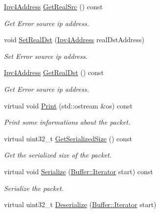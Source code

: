 \begin{DoxyCompactItemize}
\hyperlink{classns3_1_1Ipv4Address}{Ipv4\+Address} \hyperlink{classns3_1_1dsr_1_1DsrOptionAckHeader_aea48708d400fd6c6424c5b35a170c189}{Get\+Real\+Src} () const 
\begin{DoxyCompactList}\small\item\em Get Error source ip address. \end{DoxyCompactList}\item 
void \hyperlink{classns3_1_1dsr_1_1DsrOptionAckHeader_a539090972c2e824a62b09321589bbd3c}{Set\+Real\+Dst} (\hyperlink{classns3_1_1Ipv4Address}{Ipv4\+Address} real\+Dst\+Address)
\begin{DoxyCompactList}\small\item\em Set Error source ip address. \end{DoxyCompactList}\item 
\hyperlink{classns3_1_1Ipv4Address}{Ipv4\+Address} \hyperlink{classns3_1_1dsr_1_1DsrOptionAckHeader_ac5b157fac3da1a9f86b34dd310b55ee8}{Get\+Real\+Dst} () const 
\begin{DoxyCompactList}\small\item\em Get Error source ip address. \end{DoxyCompactList}\item 
virtual void \hyperlink{classns3_1_1dsr_1_1DsrOptionAckHeader_a9d0f87fa77b2b48cd71df5af52ed7f8a}{Print} (std\+::ostream \&os) const 
\begin{DoxyCompactList}\small\item\em Print some informations about the packet. \end{DoxyCompactList}\item 
virtual uint32\+\_\+t \hyperlink{classns3_1_1dsr_1_1DsrOptionAckHeader_ae76c79094943851d7f297b1fcd51003e}{Get\+Serialized\+Size} () const 
\begin{DoxyCompactList}\small\item\em Get the serialized size of the packet. \end{DoxyCompactList}\item 
virtual void \hyperlink{classns3_1_1dsr_1_1DsrOptionAckHeader_a0aeceebc3c3eb4f5241b4799b5eed36b}{Serialize} (\hyperlink{classns3_1_1Buffer_1_1Iterator}{Buffer\+::\+Iterator} start) const 
\begin{DoxyCompactList}\small\item\em Serialize the packet. \end{DoxyCompactList}\item 
virtual uint32\+\_\+t \hyperlink{classns3_1_1dsr_1_1DsrOptionAckHeader_a0c7f637f03ac2f48cfabfd8f18671a39}{Deserialize} (\hyperlink{classns3_1_1Buffer_1_1Iterator}{Buffer\+::\+Iterator} start)

\end{DoxyCompactItemize}

